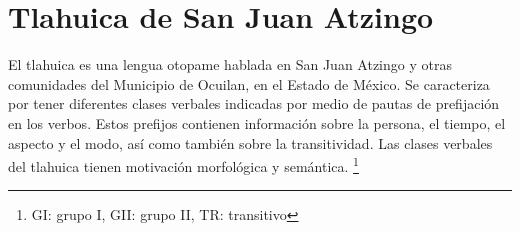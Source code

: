 \section*{Tlahuica de San Juan Atzingo}

\noindent El tlahuica es una lengua otopame hablada en San Juan Atzingo y otras comunidades del Municipio de Ocuilan, en el Estado de México. Se caracteriza por tener diferentes clases verbales indicadas por medio de pautas de prefijación en los verbos. Estos prefijos contienen información sobre la persona, el tiempo, el aspecto y el modo, así como también sobre la transitividad. Las clases verbales del tlahuica tienen motivación morfológica y semántica.
\footnote{GI: grupo I, GII: grupo II, TR: transitivo}


\vspace{0.5cm}

